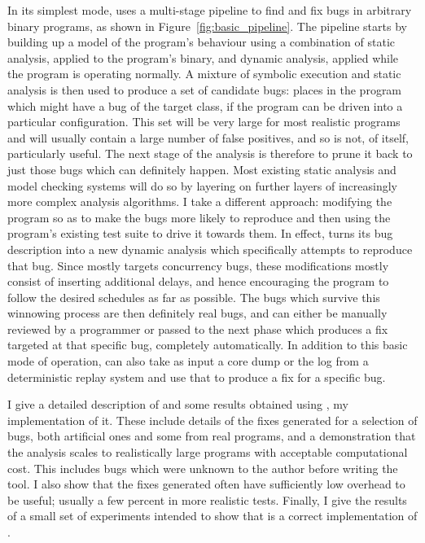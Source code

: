 In its simplest mode, \technique{} uses a multi-stage pipeline to find
and fix bugs in arbitrary binary programs, as shown in
Figure~\ref{fig:basic_pipeline}.  The pipeline starts by building up a
model of the program's behaviour using a combination of static
analysis, applied to the program's binary, and dynamic analysis,
applied while the program is operating normally.  A mixture of
symbolic execution and static analysis is then used to produce a set
of candidate bugs: places in the program which might have a bug of the
target class, if the program can be driven into a particular
configuration.  This set will be very large for most realistic
programs and will usually contain a large number of false positives,
and so is not, of itself, particularly useful.  The next stage of the
analysis is therefore to prune it back to just those bugs which can
definitely happen.  Most existing static analysis and model checking
systems will do so by layering on further layers of increasingly more
complex analysis algorithms.  I take a different approach: modifying
the program so as to make the bugs more likely to reproduce and then
using the program's existing test suite to drive it towards them.  In
effect, \technique{} turns its bug description into a new dynamic
analysis which specifically attempts to reproduce that bug.  Since
\technique{} mostly targets concurrency bugs, these modifications
mostly consist of inserting additional delays, and hence
encouraging the program to follow the desired schedules as far as
possible.  The bugs which survive this winnowing process are then
definitely real bugs, and can either be manually reviewed by a
programmer or passed to the next phase which produces a fix targeted
at that specific bug, completely automatically.  In addition to this
basic mode of operation, \technique{} can also take as input a core
dump or the log from a deterministic replay system and use that to
produce a fix for a specific bug.

I give a detailed description of \technique{} and some results obtained
using \implementation, my implementation of it.  These include details
of the fixes generated for a selection of bugs, both artificial ones
and some from real programs, and a demonstration that the analysis
scales to realistically large programs with acceptable computational
cost.  This includes bugs which were unknown to the author before
writing the tool.  I also show that the fixes generated
often have sufficiently low overhead to be useful; usually a few
percent in more realistic tests.  Finally, I give the results of a
small set of experiments intended to show that \implementation{} is a
correct implementation of \technique{}.

